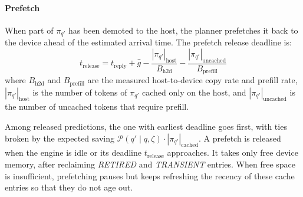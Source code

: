 \paragraph{Prefetch}
When part of $\pi_{q'}$ has been demoted to the host, the planner prefetches it back to the device ahead of the estimated arrival time. The prefetch release deadline is: 
\[
t_{\mathrm{release}}=t_{\mathrm{reply}}+\hat{g}-\frac{|\pi_{q'}|_{\mathrm{host}}}{B_{\mathrm{h2d}}}-\frac{|\pi_{q'}|_{\mathrm{uncached}}}{B_{\mathrm{prefill}}}
\]
where $B_{\mathrm{h2d}}$ and $B_{\mathrm{prefill}}$ are the measured host-to-device copy rate and prefill rate, $|\pi_{q'}|_{\mathrm{host}}$ is the number of tokens of $\pi_{q'}$ cached only on the host, and $|\pi_{q'}|_{\mathrm{uncached}}$ is the number of uncached tokens that require prefill.


Among released predictions, the one with earliest deadline goes first, with ties broken by the expected saving $\mathcal{P}(q'\mid q,\zeta)\cdot|\pi_{q'}|_{\mathrm{cached}}$. A prefetch is released when the engine is idle or its deadline $t_{\mathrm{release}}$ approaches. It takes only free device memory, after reclaiming \emph{RETIRED} and \emph{TRANSIENT} entries. When free space is insufficient, prefetching pauses but keeps refreshing the recency of these cache entries so that they do not age out. 
